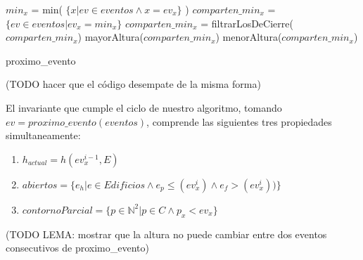 \begin{algorithm}[H]
\begin{algorithmic}
	\STATE $min_x$ = min( $\{ x | ev \in eventos  \land x = ev_x \}$ )
	\STATE $comparten\_min_x$ = $\{ ev \in eventos | ev_x = min_x \}$
		\STATE $comparten\_min_x$ = filtrarLosDeCierre($comparten\_min_x$)
		\RETURN mayorAltura($comparten\_min_x$)
	\ELSE
		\RETURN menorAltura($comparten\_min_x$)
	\ENDIF
\caption{proximo\_evento}
\end{algorithmic}
\end{algorithm}

(TODO hacer que el código desempate de la misma forma)

El invariante que cumple el ciclo de nuestro algoritmo, tomando $ev = proximo\_evento(eventos)$, comprende las siguientes
tres propiedades simultaneamente:
\begin{enumerate}
	\item $h_{actual} = h(ev_x^{i-1}, E)$
	\item $abiertos = \{ e_h | e \in Edificios \land e_p \leq (ev_x^i) \land e_f > (ev_x^i) ) \}$
	\item $contornoParcial = \{ p \in \mathbb{N}^2 | p \in C \land p_x < ev_x \}$
\end{enumerate}
(TODO LEMA: mostrar que la altura no puede cambiar entre dos eventos consecutivos de proximo\_evento)

